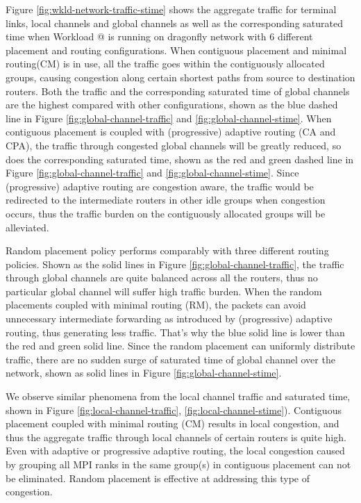 \documentclass[conference,compsoc]{IEEEtran}
\makeatletter
\newcommand{\Rmnum}[1]{\expandafter\@slowromancap\romannumeral #1@}
\makeatother
\begin{document}
Figure \ref{fig:wkld-network-traffic-stime} shows the aggregate traffic for terminal links, local channels and global channels as well as the corresponding saturated time when Workload \Rmnum{1} is running on dragonfly network with 6 different placement and routing configurations. When contiguous placement and minimal routing(CM) is in use, all the traffic goes within the contiguously allocated groups, causing congestion along certain shortest paths from source to destination routers. Both the traffic and the corresponding saturated time of global channels are the highest compared with other configurations, shown as the blue dashed line in Figure \ref{fig:global-channel-traffic} and \ref{fig:global-channel-stime}.
When contiguous placement is coupled with (progressive) adaptive routing (CA and CPA), the traffic through congested global channels will be greatly reduced, so does the corresponding saturated time, shown as the red and green dashed line in Figure \ref{fig:global-channel-traffic} and \ref{fig:global-channel-stime}. Since (progressive) adaptive routing are congestion aware, the traffic would be redirected to the intermediate routers in other idle groups when congestion occurs, thus the traffic burden on the contiguously allocated groups will be alleviated. 


Random placement policy performs comparably with three different routing policies.
Shown as the solid lines in Figure \ref{fig:global-channel-traffic}, the traffic through global channels are quite balanced across all the routers, thus no particular global channel will suffer high traffic burden. When the random placements coupled with minimal routing (RM), the packets can avoid unnecessary intermediate forwarding as introduced by (progressive) adaptive routing, thus generating less traffic. That's why the blue solid line is lower than the red and green solid line. Since the random placement can uniformly distribute traffic, there are no sudden surge of saturated time of global channel over the network, shown as solid lines in Figure \ref{fig:global-channel-stime}. 


We observe similar phenomena from the local channel traffic and saturated time, shown in Figure \ref{fig:local-channel-traffic}, \ref{fig:local-channel-stime}). Contiguous placement coupled with minimal routing (CM) results in local congestion, and thus the aggregate traffic through local channels of certain routers is quite high. Even with adaptive or progressive adaptive routing, the local congestion caused by grouping all MPI ranks in the same group(s) in contiguous placement can not be eliminated. Random placement is effective at addressing this type of congestion. 
\end{document}
